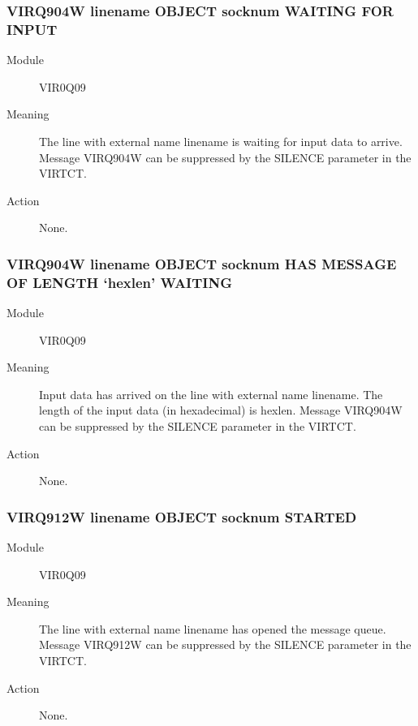 \documentclass[letterpaper,10pt,english]{sphinxmanual}
\begin{document}
\subsubsection{VIRQ904W linename OBJECT socknum WAITING FOR INPUT}
\label{\detokenize{messages:virq904w-linename-object-socknum-waiting-for-input}}\begin{description}
\item[{Module}] \leavevmode
VIR0Q09

\item[{Meaning}] \leavevmode
The line with external name linename is waiting for input data to arrive. Message VIRQ904W can be suppressed by the SILENCE parameter in the VIRTCT.

\item[{Action}] \leavevmode
None.

\end{description}


\subsubsection{VIRQ904W linename OBJECT socknum HAS MESSAGE OF LENGTH ‘hexlen’ WAITING}
\label{\detokenize{messages:virq904w-linename-object-socknum-has-message-of-length-hexlen-waiting}}\begin{description}
\item[{Module}] \leavevmode
VIR0Q09

\item[{Meaning}] \leavevmode
Input data has arrived on the line with external name linename. The length of the input data (in hexadecimal) is hexlen. Message VIRQ904W can be suppressed by the SILENCE parameter in the VIRTCT.

\item[{Action}] \leavevmode
None.

\end{description}


\subsubsection{VIRQ912W linename OBJECT socknum STARTED}
\label{\detokenize{messages:virq912w-linename-object-socknum-started}}\begin{description}
\item[{Module}] \leavevmode
VIR0Q09

\item[{Meaning}] \leavevmode
The line with external name linename has opened the message queue. Message VIRQ912W can be suppressed by the SILENCE parameter in the VIRTCT.

\item[{Action}] \leavevmode
None.

\end{description}
\end{document}
